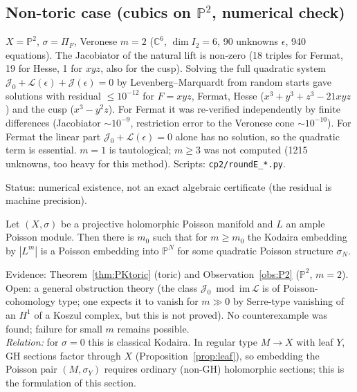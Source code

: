 \subsection{Non-toric case (cubics on $\mathbb P^2$, numerical check)}
\begin{obs}\tV\label{obs:P2}
$X=\mathbb P^2$, $\sigma=\Pi_F$, Veronese $m=2$ ($\mathbb C^6$, $\dim I_2=6$, 90 unknowns $\epsilon$, 940 equations). The Jacobiator of the natural lift is non-zero (18 triples for Fermat, 19 for Hesse, 1 for $xyz$, also for the cusp). Solving the full quadratic system $\mathcal J_0+\mathcal L(\epsilon)+\mathcal J(\epsilon)=0$ by Levenberg--Marquardt from random starts gave solutions with residual $\le10^{-12}$ for $F=xyz$, Fermat, Hesse ($x^3+y^3+z^3-21xyz$) and the cusp ($x^3-y^2z$). For Fermat it was re-verified independently by finite differences (Jacobiator $\sim10^{-9}$, restriction error to the Veronese cone $\sim10^{-10}$). For Fermat the linear part $\mathcal J_0+\mathcal L(\epsilon)=0$ alone has no solution, so the quadratic term is essential. $m=1$ is tautological; $m\ge3$ was not computed (1215 unknowns, too heavy for this method). Scripts: \texttt{cp2/roundE\_*.py}.
\end{obs}
\noindent Status: numerical existence, not an exact algebraic certificate (the residual is machine precision).

\begin{conj}\tK\label{conj:PK}
Let $(X,\sigma)$ be a projective holomorphic Poisson manifold and $L$ an ample Poisson module. Then there is $m_0$ such that for $m\ge m_0$ the Kodaira embedding by $|L^m|$ is a Poisson embedding into $\mathbb P^N$ for some quadratic Poisson structure $\sigma_N$.
\end{conj}
\noindent Evidence: Theorem~\ref{thm:PKtoric} (toric) and Observation~\ref{obs:P2} ($\mathbb P^2$, $m=2$). Open: a general obstruction theory (the class $\mathcal J_0\bmod\mathrm{im}\,\mathcal L$ is of Poisson-cohomology type; one expects it to vanish for $m\gg0$ by Serre-type vanishing of an $H^1$ of a Koszul complex, but this is not proved). No counterexample was found; failure for small $m$ remains possible.\\
\emph{Relation:} for $\sigma=0$ this is classical Kodaira. In regular type $M\to X$ with leaf $Y$, GH sections factor through $X$ (Proposition~\ref{prop:leaf}), so embedding the Poisson pair $(M,\sigma_Y)$ requires ordinary (non-GH) holomorphic sections; this is the formulation of this section.

